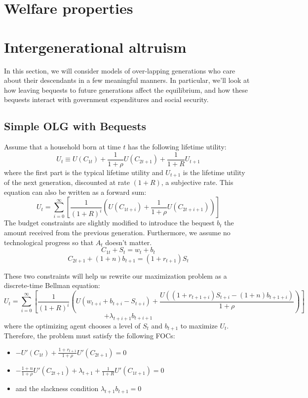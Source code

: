 \documentclass[12pt]{report}
\begin{document}
\section{Welfare properties}



\section{Intergenerational altruism}

In this section, we will consider models of over-lapping generations who care about their descendants in a few meaningful manners. In particular, we'll look at how leaving bequests to future generations affect the equilibrium, and how these bequests interact with government expenditures and social security.

\subsection{Simple OLG with Bequests}

Assume that a household born at time $t$ has the following lifetime utility: $$U_t\equiv U(C_{1t}) + \frac{1}{1+\rho} U(C_{2t+1}) + \frac{1}{1+R} U_{t+1} $$ where the first part is the typical lifetime utility and $U_{t+1}$ is the lifetime utility of the next generation, discounted at rate $(1+R)$, a subjective rate. This equation can also be written as a forward sum: $$U_t = \sum_{i=0}^{\infty} \left[ \frac{1}{(1+R)^i} \left( U(C_{1t+i}) + \frac{1}{1+\rho} U(C_{2t+i+1})\right)\right] $$ The budget constraints are slightly modified to introduce the bequest $b_t$ the amount received from the previous generation. Furthermore, we assume no technological progress so that $A_t$ doesn't matter. $$C_{1t} + S_t = w_t + b_t $$ $$C_{2t+1} + (1+n)b_{t+1} = (1+r_{t+1})S_t $$ 

These two constraints will help us rewrite our maximization problem as a discrete-time Bellman equation: $$ U_t = \sum_{i=0}^{\infty} \left[ \frac{1}{(1+R)^i} \left( U(w_{t+i} + b_{t+i} - S_{t+i}) + \frac{U((1+r_{t+1+i})S_{t+i} - (1+n)b_{t+1+i})}{1+\rho} \right)\right] $$ $$ + \lambda_{t+i+1} b_{t+i+1} $$ where the optimizing agent chooses a level of $S_t$ and $b_{t+1}$ to maximize $U_t$. Therefore, the problem must satisfy the following FOCs:\begin{itemize}
\item $ - U'(C_{1t}) + \frac{1+r_{t+1}}{1+\rho} U'(C_{2t+1}) = 0 $
\item $-\frac{1+n}{1+\rho}U'(C_{2t+1}) + \lambda_{t+1} +\frac{1}{1+R} U'(C_{1t+1}) = 0 $
\item and the slackness condition $\lambda_{t+1}b_{t+1} = 0$
\end{itemize}
\end{document}
